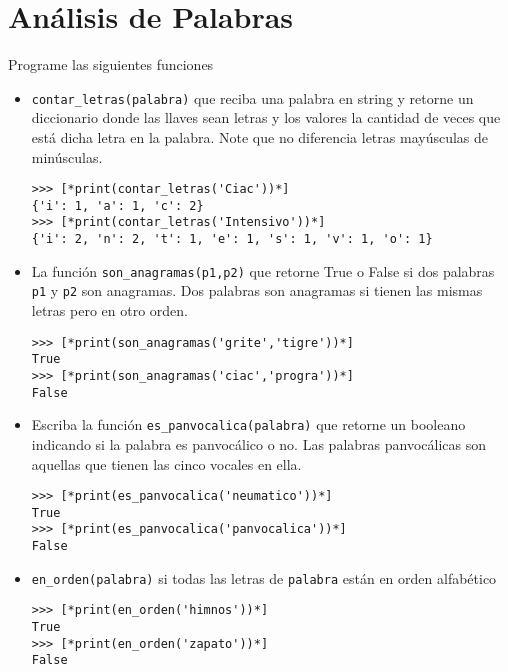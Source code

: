 \section{Análisis de Palabras}

Programe las siguientes funciones
\begin{itemize}

    \item \texttt{contar\_letras(palabra)} que reciba una palabra en string y retorne un diccionario donde las llaves sean letras y los valores la cantidad de veces que está dicha letra en la palabra. Note que no diferencia letras mayúsculas de minúsculas.
    
    \begin{lstlisting}[style=consola]
>>> [*print(contar_letras('Ciac'))*]
{'i': 1, 'a': 1, 'c': 2}
>>> [*print(contar_letras('Intensivo'))*]
{'i': 2, 'n': 2, 't': 1, 'e': 1, 's': 1, 'v': 1, 'o': 1}
    \end{lstlisting}
    
    \item La función \texttt{son\_anagramas(p1,p2)} que retorne True o False si dos palabras \texttt{p1} y \texttt{p2} son anagramas. Dos palabras son anagramas si tienen las mismas letras pero en otro orden. 
    
    \begin{lstlisting}[style=consola]
>>> [*print(son_anagramas('grite','tigre'))*]
True
>>> [*print(son_anagramas('ciac','progra'))*]
False
    \end{lstlisting}
    
    \item Escriba la función \texttt{es\_panvocalica(palabra)} que retorne un booleano indicando si la palabra es panvocálico o no. Las palabras panvocálicas son aquellas que tienen las cinco vocales en ella.
    
    \begin{lstlisting}[style=consola]
>>> [*print(es_panvocalica('neumatico'))*]
True
>>> [*print(es_panvocalica('panvocalica'))*]
False
    \end{lstlisting}
    
    \item \texttt{en\_orden(palabra)} si todas las letras de \texttt{palabra} están en orden alfabético
    \begin{lstlisting}[style=consola]
>>> [*print(en_orden('himnos'))*]
True
>>> [*print(en_orden('zapato'))*]
False
    \end{lstlisting}
    

\end{itemize}
